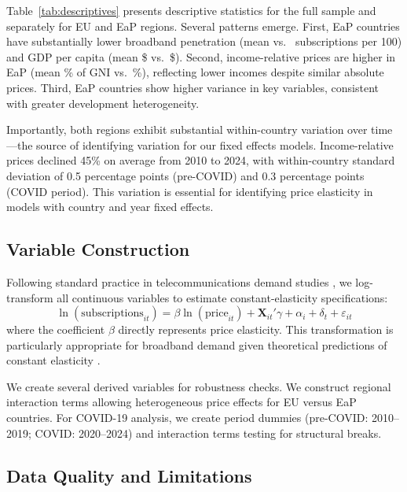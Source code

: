 Table~\ref{tab:descriptives} presents descriptive statistics for the full sample and separately for EU and EaP regions. Several patterns emerge. First, EaP countries have substantially lower broadband penetration (mean \DescSubsEaP{} vs.\ \DescSubsEU{} subscriptions per 100) and GDP per capita (mean \$\DescGDPEaP{} vs.\ \$\DescGDPEU). Second, income-relative prices are higher in EaP (mean \DescPriceGNIEaP\% of GNI vs.\ \DescPriceGNIEU\%), reflecting lower incomes despite similar absolute prices. Third, EaP countries show higher variance in key variables, consistent with greater development heterogeneity.

Importantly, both regions exhibit substantial within-country variation over time---the source of identifying variation for our fixed effects models. Income-relative prices declined 45\% on average from 2010 to 2024, with within-country standard deviation of 0.5 percentage points (pre-COVID) and 0.3 percentage points (COVID period). This variation is essential for identifying price elasticity in models with country and year fixed effects.

\subsection{Variable Construction}

Following standard practice in telecommunications demand studies \citep{dauvin2014estimating}, we log-transform all continuous variables to estimate constant-elasticity specifications:
\begin{equation}
    \ln(\text{subscriptions}_{it}) = \beta \ln(\text{price}_{it}) + \mathbf{X}_{it}'\gamma + \alpha_i + \delta_t + \varepsilon_{it}
\end{equation}
where the coefficient $\beta$ directly represents price elasticity. This transformation is particularly appropriate for broadband demand given theoretical predictions of constant elasticity \citep{hausman2001private}.

We create several derived variables for robustness checks. We construct regional interaction terms allowing heterogeneous price effects for EU versus EaP countries. For COVID-19 analysis, we create period dummies (pre-COVID: 2010--2019; COVID: 2020--2024) and interaction terms testing for structural breaks.

\subsection{Data Quality and Limitations}

